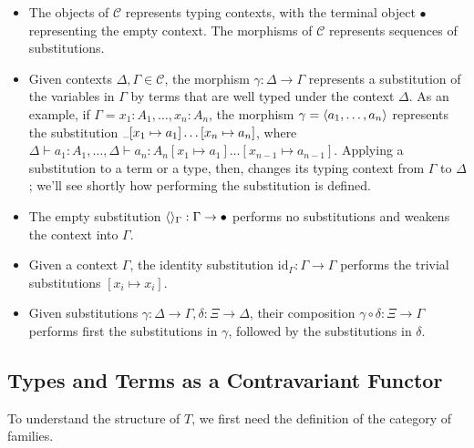 \documentclass{article}
\renewcommand{\_}{\textrm{\textscale{.5}{\textunderscore}}}
\DeclarePairedDelimiter{\ctxt}{\langle}{\rangle}
\newcommand{\id}{\mathrm{id}}
\theoremstyle{definition}
\theoremstyle{plain}
\begin{document}
\begin{itemize}
    \item The objects of $\mathcal{C}$ represents typing contexts,
    with the terminal object $\bullet$ representing the empty context.
    The morphisms of $\mathcal{C}$ represents sequences of substitutions.
    \item Given contexts $\Delta, \Gamma \in \mathcal{C}$,
    the morphism $\gamma : \Delta \to \Gamma$
    represents a substitution of the variables in $\Gamma$
    by terms that are well typed under the context $\Delta$.
    As an example, if $\Gamma = x_1 : A_1, \dots, x_n : A_n$,
    the morphism $\gamma = \ctxt{a_1, \dots, a_n}$ represents the substitution
    $\_[x_1 \mapsto a_1]\dots[x_n \mapsto a_n]$,
    where $\Delta \vdash a_1 : A_1, \dots, \Delta \vdash a_n : A_n[x_1 \mapsto a_1]\dots[x_{n-1} \mapsto a_{n-1}]$.
    Applying a substitution to a term or a type, then, changes its typing context from $\Gamma$ to $\Delta$;
    we'll see shortly how performing the substitution is defined.
    \item The empty substitution $\ctxt{}_\Gamma : \Gamma \to \bullet$ performs no substitutions
    and weakens the context into $\Gamma$.
    \item Given a context $\Gamma$, the identity substitution $\id_\Gamma : \Gamma \to \Gamma$
    performs the trivial substitutions $[x_i \mapsto x_i]$.
    \item Given substitutions $\gamma : \Delta \to \Gamma, \delta : \Xi \to \Delta$,
    their composition $\gamma \circ \delta : \Xi \to \Gamma$
    performs first the substitutions in $\gamma$, followed by the substitutions in $\delta$.
\end{itemize}

\subsection{Types and Terms as a Contravariant Functor}

To understand the structure of $T$, we first need the definition of the category of families.
\end{document}
